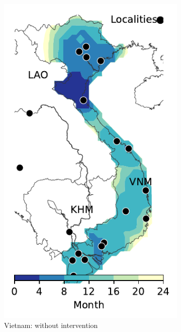 \documentclass[10pt]{article}
\theoremstyle{definition}
\begin{document}
\begin{figure}[!ht]
\begin{subfigure}[b]{.28\textwidth}
\includegraphics[width=\textwidth]{../cellular_automata/results/contour/VN_model-B_precip1_m1_l3.pdf}
\caption{Vietnam: without intervention\label{fig:vnmBContour}}
\end{subfigure}
\begin{subfigure}[b]{.28\textwidth}

\end{subfigure}
\end{figure}
\end{document}
